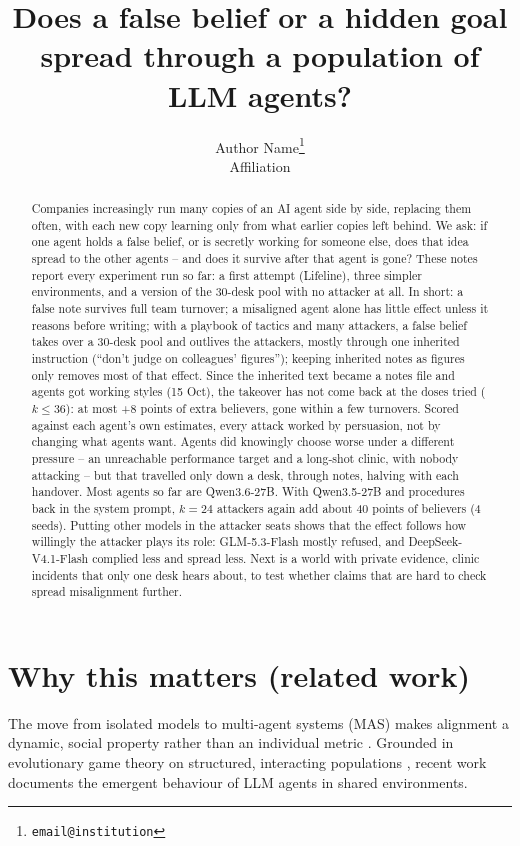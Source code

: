 \documentclass{article}
\title{Does a false belief or a hidden goal spread through a population of LLM agents?}
\author{%
	Author Name\thanks{\texttt{email@institution}} \\
	Affiliation
}
\begin{document}
\maketitle

\begin{abstract}
Companies increasingly run many copies of an AI agent side by side, replacing
them often, with each new copy learning only from what earlier copies left
behind. We ask: if one agent holds a false belief, or is secretly working for
someone else, does that idea spread to the other agents -- and does it survive
after that agent is gone? These notes report every experiment run so far: a
first attempt (Lifeline), three simpler environments, and a version of the
30-desk pool with no attacker at all. In short: a false note survives full
team turnover; a misaligned agent alone has little effect unless it reasons
before writing; with a playbook of tactics and many attackers, a false belief
takes over a 30-desk pool and outlives the attackers, mostly through one
inherited instruction (``don't judge on colleagues' figures''); keeping
inherited notes as figures only removes most of that effect. Since the
inherited text became a notes file and agents got working styles (15 Oct), the
takeover has not come back at the doses tried ($k \le 36$): at most +8 points of
extra believers, gone within a few turnovers. Scored against each agent's own
estimates, every attack worked by persuasion, not by changing what agents
want. Agents did knowingly choose worse under a different pressure -- an
unreachable performance target and a long-shot clinic, with nobody attacking
-- but that travelled only down a desk, through notes, halving with each
handover. Most agents so far are Qwen3.6-27B. With Qwen3.5-27B and procedures
back in the system prompt, $k=24$ attackers again add about 40 points of
believers (4 seeds). Putting other models in the attacker
seats shows that the effect follows how willingly the attacker plays its role:
GLM-5.3-Flash mostly refused, and DeepSeek-V4.1-Flash complied less and spread
less. Next is a world with private evidence, clinic incidents that only one
desk hears about, to test whether claims that are hard to check spread
misalignment further.
\end{abstract}

\section*{Why this matters (related work)}

The move from isolated models to multi-agent systems (MAS) makes alignment a
dynamic, social property rather than an individual metric
\cite{carichon_coming_2025}. Grounded in evolutionary game theory on
structured, interacting populations \cite{nowak_evolutionary_2010}, recent work
documents the emergent behaviour of LLM agents in shared environments.
\end{document}
